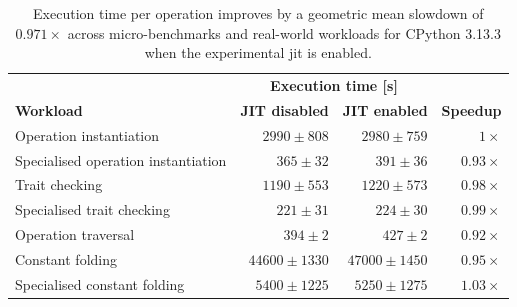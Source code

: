 \begin{table}[H]
  \caption{Execution time per operation improves by a geometric mean slowdown of $0.971\times$ across micro-benchmarks and real-world workloads for CPython 3.13.3 when the experimental \ac{jit} is enabled.}
  \label{tab:experimental-jit-compiler-xdsl}
  \centering
  \begin{tabular}{lrrr}
    \toprule
    & \multicolumn{2}{c}{\textbf{Execution time [s]}} \\
    \cmidrule(r){2-3}
    \textbf{Workload}& \textbf{JIT disabled} & \textbf{JIT enabled} & \textbf{Speedup} \\
    \midrule
    Operation instantiation & $2990 \pm 808$ & $2980 \pm 759$ & $1\times$ \\
    Specialised operation instantiation & $365 \pm 32$ & $391 \pm 36$ & $0.93\times$ \\
    Trait checking & $1190 \pm 553$ & $1220 \pm 573$ & $0.98\times$ \\
    Specialised trait checking & $221 \pm 31$ & $224 \pm 30$ & $0.99\times$ \\
    Operation traversal & $394 \pm 2$ & $427 \pm 2$ & $0.92\times$ \\ %
    Constant folding & $44600 \pm 1330$ & $47000 \pm 1450$ & $0.95\times$ \\
    Specialised constant folding & $5400 \pm 1225$ & $5250 \pm 1275$ & $1.03\times$ \\
    \bottomrule
  \end{tabular}
\end{table}

